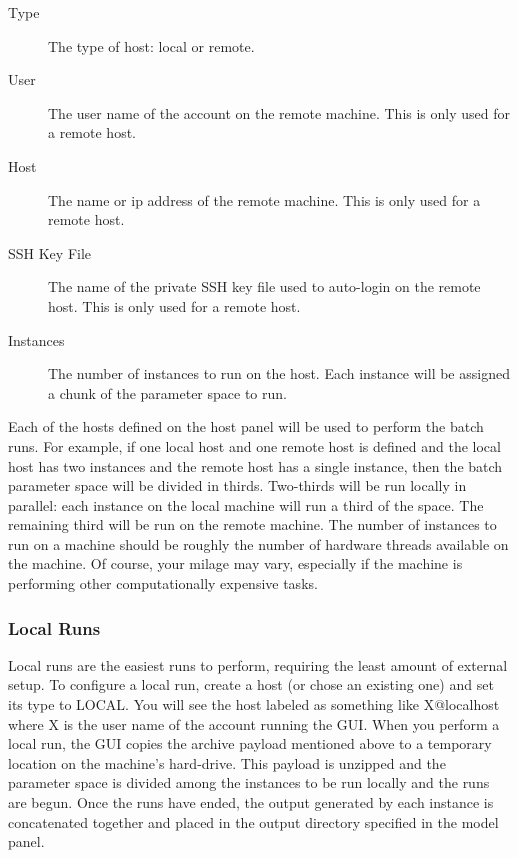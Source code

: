 \documentclass[11pt]{amsart}
\begin{document}
\begin{description}
\item[Type] The type of host: local or remote.
\item[User] The user name of the account on the remote machine. This is only used for a remote host.
\item[Host] The name or ip address of the remote machine. This is only used for a remote host.
\item[SSH Key File] The name of the private SSH key file used to auto-login on the remote host. This is only used for a remote host.
\item[Instances] The number of instances to run on the host. Each instance will be assigned a chunk of the parameter space to run.
\end{description}

Each of the hosts defined on the host panel will be used to perform the batch runs. For example, if one local host and one remote host is defined and the local host has two instances and the remote host has a single instance, then the batch parameter space will be divided in thirds. Two-thirds will be run locally in parallel: each instance on the local machine will run a third of the space. The remaining third will be run on the remote machine. The number of instances to run on a machine should be roughly the number of hardware threads available on the machine. Of course, your milage may vary, especially if the machine is performing other computationally expensive tasks.  

\subsubsection{Local Runs}
Local runs are the easiest runs to perform, requiring the least amount of external setup. To configure a local run, create a host (or chose an existing one) and set its type to LOCAL. You will see the host labeled as something like X@localhost where X is the user name of the account running the GUI. When you perform a local run, the GUI copies the archive payload mentioned above to a temporary location on the machine's hard-drive. This payload is unzipped and the parameter space is divided among the instances to be run locally and the runs are begun. Once the runs have ended, the output generated by each instance is concatenated together and placed in the output directory specified in the model panel.
\end{document}

